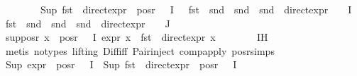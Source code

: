 \begin{isabellebody}
\ \ \ \ \ \ \ \ {\isacharparenleft}{\kern0pt}Sup\ {\isacharparenleft}{\kern0pt}{\isacharparenleft}{\kern0pt}{\isacharparenleft}{\kern0pt}fst\ {\isasymcirc}\ direct{\isacharunderscore}{\kern0pt}expr{\isacharparenright}{\kern0pt}\ {\isacharbackquote}{\kern0pt}\ {\isacharparenleft}{\kern0pt}pos{\isacharunderscore}{\kern0pt}r\ {\isacharparenleft}{\kern0pt}{\isasymPhi}\ {\isacharbackquote}{\kern0pt}\ I{\isacharparenright}{\kern0pt}{\isacharparenright}{\kern0pt}{\isacharparenright}{\kern0pt}\ \ {\isasymunion}\ {\isacharparenleft}{\kern0pt}fst\ {\isasymcirc}\ snd\ {\isasymcirc}\ snd\ {\isasymcirc}\ snd\ {\isasymcirc}\ direct{\isacharunderscore}{\kern0pt}expr\ {\isasymcirc}\ {\isasymPhi}{\isacharparenright}{\kern0pt}\ {\isacharbackquote}{\kern0pt}\ I\ {\isasymunion}\ {\isacharparenleft}{\kern0pt}fst\ {\isasymcirc}\ snd\ {\isasymcirc}\ snd\ {\isasymcirc}\ snd\ {\isasymcirc}\ direct{\isacharunderscore}{\kern0pt}expr\ {\isasymcirc}\ {\isasymPhi}{\isacharparenright}{\kern0pt}\ {\isacharbackquote}{\kern0pt}\ J{\isacharparenright}{\kern0pt}{\isacharparenright}{\kern0pt}{\isachardoublequoteclose}\isanewline
\ \ \isamarkupfalse%
{\isacharminus}{\kern0pt}\isanewline
\ \ \ \ \isamarkupfalse%
\ sup{\isacharunderscore}{\kern0pt}pos{\isacharunderscore}{\kern0pt}r{\isacharcolon}{\kern0pt}\ {\isachardoublequoteopen}{\isasymforall}x\ {\isasymin}\ pos{\isacharunderscore}{\kern0pt}r\ {\isacharparenleft}{\kern0pt}{\isasymPhi}\ {\isacharbackquote}{\kern0pt}\ I{\isacharparenright}{\kern0pt}{\isachardot}{\kern0pt}\ expr{\isacharunderscore}{\kern0pt}{}\ x\ {\isacharequal}{\kern0pt}\ {\isacharparenleft}{\kern0pt}fst\ {\isasymcirc}\ direct{\isacharunderscore}{\kern0pt}expr{\isacharparenright}{\kern0pt}\ x{\isachardoublequoteclose}\isanewline
\ \ \ \ \ \ \isamarkupfalse%
\ IH\ \isanewline
\ \ \ \ \ \ \isamarkupfalse%
\ {\isacharparenleft}{\kern0pt}metis\ {\isacharparenleft}{\kern0pt}no{\isacharunderscore}{\kern0pt}types{\isacharcomma}{\kern0pt}\ lifting{\isacharparenright}{\kern0pt}\ Diff{\isacharunderscore}{\kern0pt}iff\ Pair{\isacharunderscore}{\kern0pt}inject\ comp{\isacharunderscore}{\kern0pt}apply\ pos{\isacharunderscore}{\kern0pt}r{\isachardot}{\kern0pt}simps{\isacharparenright}{\kern0pt}\isanewline
\ \ \ \ \isamarkupfalse%
\ {\isachardoublequoteopen}Sup\ {\isacharparenleft}{\kern0pt}expr{\isacharunderscore}{\kern0pt}{}\ {\isacharbackquote}{\kern0pt}\ pos{\isacharunderscore}{\kern0pt}r\ {\isacharparenleft}{\kern0pt}{\isasymPhi}\ {\isacharbackquote}{\kern0pt}\ I{\isacharparenright}{\kern0pt}{\isacharparenright}{\kern0pt}\ {\isacharequal}{\kern0pt}\ Sup\ {\isacharparenleft}{\kern0pt}{\isacharparenleft}{\kern0pt}fst\ {\isasymcirc}\ direct{\isacharunderscore}{\kern0pt}expr{\isacharparenright}{\kern0pt}\ {\isacharbackquote}{\kern0pt}\ pos{\isacharunderscore}{\kern0pt}r\ {\isacharparenleft}{\kern0pt}{\isasymPhi}\ {\isacharbackquote}{\kern0pt}\ I{\isacharparenright}{\kern0pt}{\isacharparenright}{\kern0pt}{\isachardoublequoteclose}\isanewline

\end{isabellebody}
